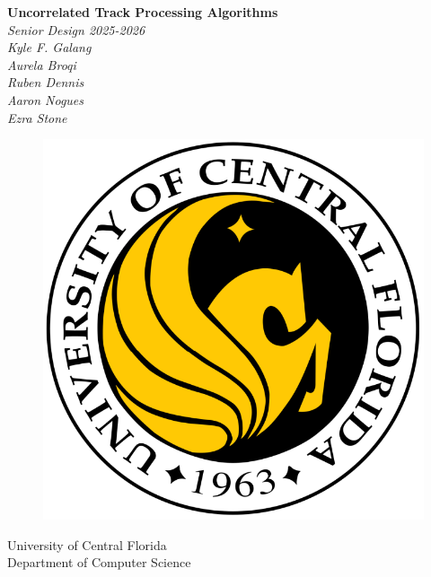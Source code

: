 \documentclass[11pt,letterpaper]{article}
\begin{document}

\begin{titlepage}
\begin{center}
\vspace*{1cm}
	\huge{\textbf{Uncorrelated Track Processing Algorithms}}\\
	\vspace{0.5cm}
	\large{\textit{Senior Design 2025-2026}}\\
	\vspace{1.5cm}
	\textit{Kyle F. Galang}\\
	\textit{Aurela Broqi}\\
	\textit{Ruben Dennis}\\
	\textit{Aaron Nogues}\\
	\textit{Ezra Stone}
	\vfill
	\begin{figure}[H]
	\centering
	\begin{center}
	\includegraphics[scale=0.25, center]{UCF-logo.png}
	\end{center}
	\end{figure}
	University of Central Florida\\
	Department of Computer Science
\end{center}
\end{titlepage}
\end{document}
